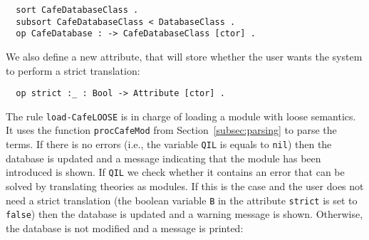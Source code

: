 {\codesize
\begin{verbatim}
  sort CafeDatabaseClass .
  subsort CafeDatabaseClass < DatabaseClass .
  op CafeDatabase : -> CafeDatabaseClass [ctor] .
\end{verbatim}
}

We also define a new attribute, that will store whether the user wants the system
to perform a strict translation:

{\codesize
\begin{verbatim}
  op strict :_ : Bool -> Attribute [ctor] .
\end{verbatim}
}
{\codesize
\begin{comment}
  var  N : Nat .
  var  X@Database : CafeDatabaseClass .
  var  CafeM : CafeModule .
  var  O : Oid .
  vars Q QI F : Qid .
  vars QIL QIL' QIL'' : QidList .
  vars T T' T'' : Term .
  var  TL : TermList .
  vars H H' : Header .
  vars DB DB' DB'' : Database .
  vars MD SM SM' SM'' : SModule .
  var  Atts : AttributeSet .
  vars RP RP' : ResultPair? .
  vars ME ME' ME'' : ModuleExpression .
  var  B : Bool .
  var  ODS : OpDeclSet .
  vars M M' : Module .
\end{comment}
}

The rule \verb"load-CafeLOOSE" is in charge of loading a module with loose semantics.
It uses the function \verb"procCafeMod" from Section~\ref{subsec:parsing} to parse the
terms. If there is no errors (i.e., the variable \verb"QIL" is equals to \verb"nil")
then the database is updated and a message indicating that the module has been introduced
is shown.
If \verb"QIL" we check whether it contains an error that can be solved by translating
theories as modules. If this is the case and the user does not need a strict translation
(the boolean variable \verb"B" in the attribute \verb"strict" is set to \verb"false")
then the database is updated and a warning message is shown. Otherwise, the database
is not modified and a message is printed:

